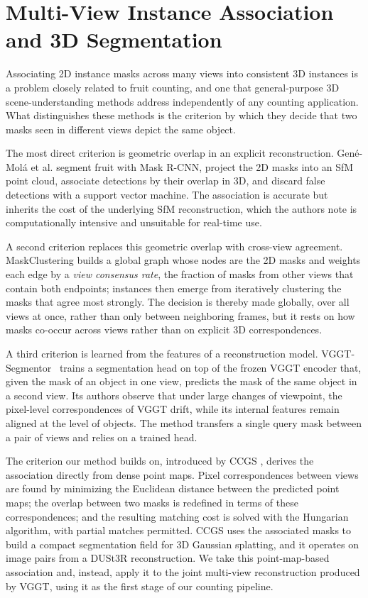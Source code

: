 \documentclass[english, egger, bsc]{vcethesis}
\begin{document}
\section{Multi-View Instance Association and 3D Segmentation}
Associating 2D instance masks across many views into consistent 3D instances is a problem closely related to fruit counting, and one that general-purpose 3D scene-understanding methods address independently of any counting application. What distinguishes these methods is the criterion by which they decide that two masks seen in different views depict the same object.

The most direct criterion is geometric overlap in an explicit reconstruction. Gené-Molá et al. \cite{genemola2020} segment fruit with Mask R-CNN, project the 2D masks into an SfM point cloud, associate detections by their overlap in 3D, and discard false detections with a support vector machine. The association is accurate but inherits the cost of the underlying SfM reconstruction, which the authors note is computationally intensive and unsuitable for real-time use.

A second criterion replaces this geometric overlap with cross-view agreement. MaskClustering \cite{yan2024maskclustering} builds a global graph whose nodes are the 2D masks and weights each edge by a \emph{view consensus rate}, the fraction of masks from other views that contain both endpoints; instances then emerge from iteratively clustering the masks that agree most strongly. The decision is thereby made globally, over all views at once, rather than only between neighboring frames, but it rests on how masks co-occur across views rather than on explicit 3D correspondences.

A third criterion is learned from the features of a reconstruction model. VGGT-Segmentor~\cite{gao2026vggts} trains a segmentation head on top of the frozen VGGT encoder that, given the mask of an object in one view, predicts the mask of the same object in a second view. Its authors observe that under large changes of viewpoint, the pixel-level correspondences of VGGT drift, while its internal features remain aligned at the level of objects. The method transfers a single query mask between a pair of views and relies on a trained head.

The criterion our method builds on, introduced by CCGS \cite{hu2026ccgs}, derives the association directly from dense point maps. Pixel correspondences between views are found by minimizing the Euclidean distance between the predicted point maps; the overlap between two masks is redefined in terms of these correspondences; and the resulting matching cost is solved with the Hungarian algorithm, with partial matches permitted. CCGS uses the associated masks to build a compact segmentation field for 3D Gaussian splatting, and it operates on image pairs from a DUSt3R reconstruction. We take this point-map-based association and, instead, apply it to the joint multi-view reconstruction produced by VGGT, using it as the first stage of our counting pipeline.
\end{document}
